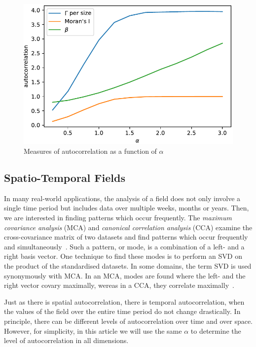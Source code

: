 \documentclass[sigconf]{acmart}
\begin{document}
\begin{figure}[h]
\begin{center}
\includegraphics[width=0.8\columnwidth]{Results/plotGammaAndMoransIAndBeta.pdf}
\caption[Various measures of autocorrelation]{Measures of autocorrelation as a function of $\alpha$}
\label{fig:plotGammaAndMoransIAndBeta}
\end{center}
\end{figure}

\subsection{Spatio-Temporal Fields}
\label{sec:Introduction Spatio-Temporal Fields}

In many real-world applications, the analysis of a field does not only involve a single time period but includes data over multiple weeks, months or years. Then, we are interested in finding patterns which occur frequently. The \textit{maximum covariance analysis} (MCA) and \textit{canonical correlation analysis} (CCA) examine the cross-covariance matrix of two datasets and find patterns which occur frequently and simultaneously~\cite{Eshel2011, Storch1999}. Such a pattern, or mode, is a combination of a left- and a right basis vector. One technique to find these modes is to perform an SVD on the product of the standardised datasets. In some domains, the term SVD is used synonymously with MCA. In an MCA, modes are found where the left- and the right vector covary maximally, wereas in a CCA, they correlate maximally~\cite{Bretherton1992}.

Just as there is spatial autocorrelation, there is temporal autocorrelation, when the values of the field over the entire time period do not change drastically. In principle, there can be different levels of autocorrelation over time and over space. However, for simplicity, in this article we will use the same $\alpha$ to determine the level of autocorrelation in all dimensions.
\end{document}
